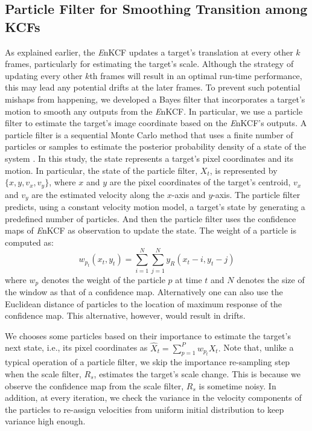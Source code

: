 \documentclass{bmvc2k}
\begin{document}
\subsection{Particle Filter for Smoothing Transition among KCFs} \label{sc:PF}
As explained earlier, the {\it E}nKCF updates a target's translation at
every other $k$ frames, particularly for estimating the target's
scale. Although the strategy of updating every other $k$th frames will
result in an optimal run-time performance, this may lead any potential
drifts at the later frames. To prevent such potential mishaps from
happening, we developed a Bayes filter that incorporates a target's
motion to smooth any outputs from the {\it E}nKCF. In particular, we
use a particle filter to estimate the target's image coordinate based
on the {\it E}nKCF's outputs. A particle filter is a sequential Monte
Carlo method that uses a finite number of particles or samples to
estimate the posterior probability density of a state of the system
\cite{thrun2005probabilistic}. In this study, the state represents a
target's pixel coordinates and its motion. In particular, the state of
the particle filter, $X_t$, is represented by $\lbrace x, y, v_{x},
v_{y} \rbrace$, where $x$ and $y$ are the pixel coordinates of the
target's centroid, $v_x$ and $v_y$ are the estimated velocity along
the $x$-axis and $y$-axis. The particle filter predicts, using a
constant velocity motion model, a target's state by generating a
predefined number of particles. And then the particle filter uses the
confidence maps of {\it E}nKCF as observation to update the state. The
weight of a particle is computed as:
\begin{equation}
w_{p_{t}}(x_{t},y_{t}) = \sum_{i=1}^{N}\sum_{j=1}^{N} y_{R}(x_{t}-i,y_{t}-j)
\end{equation}
where $w_{p}$ denotes the weight of the particle $p$ at time $t$ and
$N$ denotes the size of the window as that of a confidence
map. Alternatively one can also use the Euclidean distance of
particles to the location of maximum response of the confidence
map. This alternative, however, would result in drifts. 

We chooses some particles based on their importance to estimate the
target's next state, i.e., its pixel coordinates as $\hat{X}_{t} =
\sum_{p=1}^{P}w_{p_{t}} X_{t}.$ Note that, unlike a typical operation
of a particle filter, we skip the importance re-sampling step when the
scale filter, $R_{s}$, estimates the target's scale change. This is
because we observe the confidence map from the scale filter, $R_s$ is
sometime noisy. In addition, at every iteration, we check the variance
in the velocity components of the particles to re-assign velocities
from uniform initial distribution to keep variance high enough.
\end{document}
